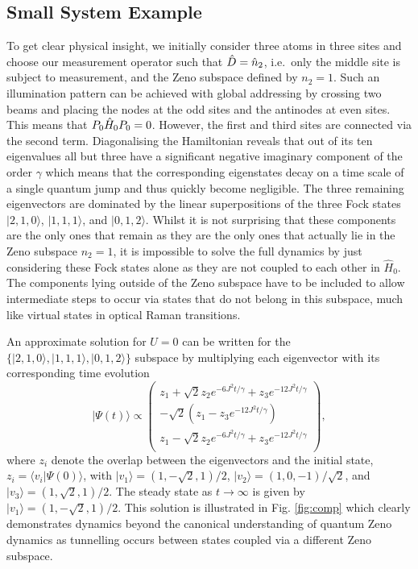 \subsection{Small System Example}

To get clear physical insight, we initially consider three atoms in
three sites and choose our measurement operator such that
$\hat{D} = \hat{n}_2$, i.e.~only the middle site is subject to measurement,
and the Zeno subspace defined by $n_2 = 1$. Such an illumination
pattern can be achieved with global addressing by crossing two beams
and placing the nodes at the odd sites and the antinodes at even
sites. This means that $P_0 \hat{H}_0 P_0 = 0$. However, the
first and third sites are connected via the second term. Diagonalising
the Hamiltonian reveals that out of its ten eigenvalues all but three
have a significant negative imaginary component of the order $\gamma$
which means that the corresponding eigenstates decay on a time scale
of a single quantum jump and thus quickly become negligible. The three
remaining eigenvectors are dominated by the linear superpositions of
the three Fock states $|2,1,0 \rangle$, $|1, 1, 1 \rangle$, and
$|0,1,2 \rangle$. Whilst it is not surprising that these components
are the only ones that remain as they are the only ones that actually
lie in the Zeno subspace $n_2 = 1$, it is impossible to solve the full
dynamics by just considering these Fock states alone as they are not
coupled to each other in $\hat{H}_0$. The components lying outside of
the Zeno subspace have to be included to allow intermediate steps to
occur via states that do not belong in this subspace, much like
virtual states in optical Raman transitions.

An approximate solution for $U=0$ can be written for the
$\{|2,1,0 \rangle, |1,1,1 \rangle, |0,1,2 \rangle\}$ subspace by
multiplying each eigenvector with its corresponding time evolution
\begin{equation}
  | \Psi(t) \rangle \propto \left( \begin{array}{c} 
  z_1 + \sqrt{2} z_2 e^{-6 J^2 t / \gamma} + z_3 e^{-12 J^2 t / \gamma} \\
  -\sqrt{2} \left(z_1 - z_3 e^{-12 J^2 t / \gamma} \right) \\ 
  z_1 - \sqrt{2} z_2 e^{-6 J^2 t / \gamma} + z_3 e^{-12 J^2 t /
                                     \gamma} \\ 
                                   \end{array} 
                                 \right), \nonumber
\end{equation}
where $z_i$ denote the overlap between the eigenvectors and the
initial state, $z_i = \langle v_i | \Psi (0) \rangle$, with
$| v_1 \rangle = (1, -\sqrt{2}, 1)/2$,
$| v_2 \rangle = (1, 0, -1)/\sqrt{2}$, and
$| v_3 \rangle = (1, \sqrt{2}, 1)/2$. The steady state as
$t \rightarrow \infty$ is given by
$| v_1 \rangle = (1, -\sqrt{2}, 1)/2$. This solution is illustrated in
Fig. \ref{fig:comp} which clearly demonstrates dynamics beyond the
canonical understanding of quantum Zeno dynamics as tunnelling occurs
between states coupled via a different Zeno subspace.

